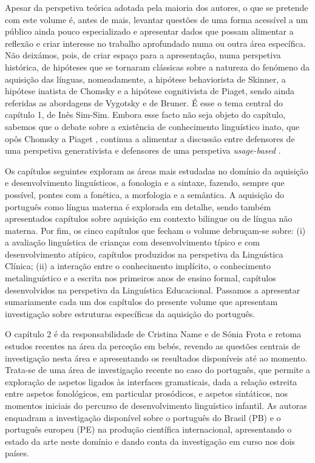 \begin{refsection}
Apesar da perspetiva teórica adotada pela maioria dos autores, o que se pretende com este volume é, antes de mais, levantar questões de uma forma acessível a um público ainda pouco especializado e apresentar dados que possam alimentar a reflexão e criar interesse no trabalho aprofundado numa ou outra área específica. Não deixámos, pois, de criar espaço para a apresentação, numa perspetiva histórica, de hipóteses que se tornaram clássicas sobre a natureza do fenómeno da aquisição das línguas, nomeadamente, a hipótese behaviorista de Skinner, a hipótese inatista de Chomsky e a hipótese cognitivista de Piaget, sendo ainda referidas as abordagens de Vygotsky e de Bruner. É esse o tema central do capítulo 1, de Inês Sim-Sim. Embora esse facto não seja objeto do capítulo, sabemos que o debate sobre a existência de conhecimento linguístico inato, que opôs Chomsky a Piaget \citep{piattelli-palmarini1980}, continua a alimentar a discussão entre defensores de uma perspetiva generativista e defensores de uma perspetiva \textit{usage-based} \citep{tomasello2003}.

Os capítulos seguintes exploram as áreas mais estudadas no domínio da aquisição e desenvolvimento linguísticos, a fonologia e a sintaxe, fazendo, sempre que possível, pontes com a fonética, a morfologia e a semântica. A aquisição do português como língua materna é explorada em detalhe, sendo também apresentados capítulos sobre aquisição em contexto bilingue ou de língua não materna. Por fim, os cinco capítulos que fecham o volume debruçam-se sobre: (i) a avaliação linguística de crianças com desenvolvimento típico e com desenvolvimento atípico, capítulos produzidos na perspetiva da Linguística Clínica; (ii) a interação entre o conhecimento implícito, o conhecimento metalinguístico e a escrita nos primeiros anos de ensino formal, capítulos desenvolvidos na perspetiva da Linguística Educacional. Passamos a apresentar sumariamente cada um dos capítulos do presente volume que apresentam investigação sobre estruturas específicas da aquisição do português.

O capítulo 2 é da responsabilidade de Cristina Name e de Sónia Frota e retoma estudos recentes na área da perceção em bebés, revendo as questões centrais de investigação nesta área e apresentando os resultados disponíveis até ao momento. Trata-se de uma área de investigação recente no caso do português, que permite a exploração de aspetos ligados às interfaces gramaticais, dada a relação estreita entre aspetos fonológicos, em particular prosódicos, e aspetos sintáticos, nos momentos iniciais do percurso de desenvolvimento linguístico infantil. As autoras enquadram a investigação disponível sobre o português do Brasil (PB) e o português europeu (PE) na produção científica internacional, apresentando o estado da arte neste domínio e dando conta da investigação em curso nos dois países.


\end{refsection}
